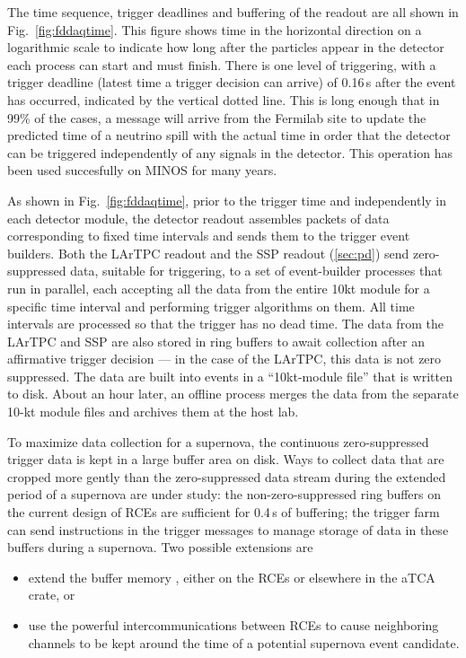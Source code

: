 The time sequence, trigger deadlines and buffering of the readout are all
shown in Fig.~\ref{fig:fddaqtime}.  This figure shows time in the
horizontal direction on a logarithmic scale to indicate how long after
the particles appear in the detector each process can start and must
finish.  There is one level of triggering, with a trigger deadline
(latest time a trigger decision can arrive) of
0.16\,s after the event has occurred, indicated by the vertical dotted
line.  This is long enough that in 99\% of the cases, a message will
arrive from the Fermilab site to update the predicted time of a
neutrino spill with the actual time in order that the detector can be
triggered independently of any signals in the detector.  This
operation has been used succesfully on MINOS for many years.  

As shown in Fig.~\ref{fig:fddaqtime}, prior to the trigger time and
independently in each detector module, the detector readout assembles
packets of data corresponding to fixed time intervals and sends them
to the trigger event builders.  Both the LArTPC readout and the SSP
readout (\ref{sec:pd}) send zero-suppressed data, suitable for triggering, to a set
of event-builder processes that run in parallel, each accepting all
the data from the entire 10kt module for a specific time interval and
performing trigger algorithms on them.  All time intervals are
processed so that the trigger has no dead time.  The data from the LArTPC and SSP
are also stored in ring buffers
  to await collection after an
affirmative trigger decision --- in the case of the LArTPC, this data
is not zero suppressed.  The data are built into events in a ``10kt-module
file'' that is written to disk.  About an hour later, an offline process merges
the data from the separate 10-kt module files and archives them at the host lab.

To maximize data collection for a supernova, the continuous
zero-suppressed trigger data is kept in a large buffer area on disk.
Ways to collect data that are cropped more gently than the zero-suppressed 
data stream during the extended period of a supernova are
under study: the non-zero-suppressed ring buffers on the current
design of RCEs are sufficient for 0.4\,s of buffering; the trigger farm can send
instructions in the trigger messages to manage storage of data in
these buffers during a supernova. Two possible extensions
are
\begin{itemize}
\item extend the buffer memory , either on the RCEs or elsewhere in the aTCA crate, or

\item use the powerful intercommunications between RCEs to cause neighboring
channels to be kept around the time of a potential supernova event candidate. 

\end{itemize}

